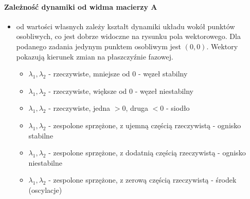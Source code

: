 \documentclass[a4paper, 12pt]{article}
\begin{document}
	\paragraph{Zależność dynamiki od widma macierzy A}
	\begin{itemize}
		\item od wartości własnych zależy kształt dynamiki układu wokół punktów osobliwych, co jest dobrze widoczne na rysunku pola wektorowego. Dla podanego zadania jedynym punktem osobliwym jest $(0,0)$. Wektory pokazują kierunek zmian na płaszczyźnie fazowej.
		\begin{itemize}
			\item $\lambda _1, \lambda _2$ - rzeczywiste, mniejsze od 0 - węzeł stabilny
			\item $\lambda _1, \lambda _2$ - rzeczywiste, większe od 0 - węzeł niestabilny
			\item $\lambda _1, \lambda _2$ - rzeczywiste, jedna $>0$, druga $<0$ - siodło
			\item $\lambda _1, \lambda _2$ - zespolone sprzężone, z ujemną częścią rzeczywistą - ognisko stabilne
			\item $\lambda _1, \lambda _2$ - zespolone sprzężone, z dodatnią częścią rzeczywistą - ognisko niestabilne
			\item $\lambda _1, \lambda _2$ - zespolone sprzężone, z zerową częścią rzeczywistą - środek (oscylacje)
		\end{itemize}
		\begin{figure}[h]
			\begin{center}

\end{center}
\end{figure}
\end{itemize}
\end{document}
